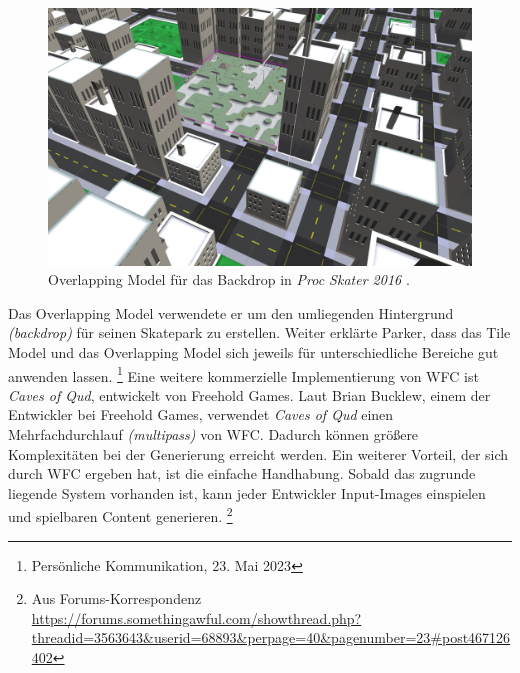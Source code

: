 \documentclass[12pt, a4paper,twoside,openright]{report} %
\begin{document}
\begin{figure}
    \includegraphics[width=1\linewidth]{images/proc-skate-backdrop.png}%
    \caption{Overlapping Model für das Backdrop in \textit{Proc Skater 2016} \cite{procskater2016}.}%
\end{figure}

Das Overlapping Model verwendete er um den umliegenden Hintergrund \textit{(backdrop)} für seinen Skatepark zu erstellen.
Weiter erklärte Parker, dass das Tile Model und das Overlapping Model sich jeweils für unterschiedliche Bereiche gut anwenden lassen.
\footnote[5]{Persönliche Kommunikation, 23. Mai 2023}
\newline
Eine weitere kommerzielle Implementierung von WFC ist \textit{Caves of Qud}, entwickelt von Freehold Games.
Laut Brian Bucklew, einem der Entwickler bei Freehold Games, verwendet \textit{Caves of Qud} einen Mehrfachdurchlauf \textit{(multipass)} von WFC.
Dadurch können größere Komplexitäten bei der Generierung erreicht werden.
Ein weiterer Vorteil, der sich durch WFC ergeben hat, ist die einfache Handhabung.
Sobald das zugrunde liegende System vorhanden ist, kann jeder Entwickler Input-Images einspielen und spielbaren Content generieren.
\footnote[6]{Aus Forums-Korrespondenz \url{https://forums.somethingawful.com/showthread.php?threadid=3563643&userid=68893&perpage=40&pagenumber=23\#post467126402}} \cite{Karth2017WaveFunctionCollapseIC}
\end{document}
